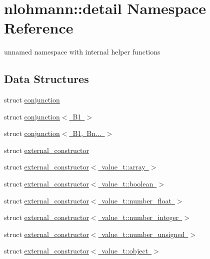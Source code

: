 \hypertarget{namespacenlohmann_1_1detail}{}\section{nlohmann\+::detail Namespace Reference}
\label{namespacenlohmann_1_1detail}


unnamed namespace with internal helper functions  


\subsection*{Data Structures}
\begin{DoxyCompactItemize}
\item 
struct \mbox{\hyperlink{structnlohmann_1_1detail_1_1conjunction}{conjunction}}
\item 
struct \mbox{\hyperlink{structnlohmann_1_1detail_1_1conjunction_3_01_b1_01_4}{conjunction$<$ B1 $>$}}
\item 
struct \mbox{\hyperlink{structnlohmann_1_1detail_1_1conjunction_3_01_b1_00_01_bn_8_8_8_01_4}{conjunction$<$ B1, Bn... $>$}}
\item 
struct \mbox{\hyperlink{structnlohmann_1_1detail_1_1external__constructor}{external\+\_\+constructor}}
\item 
struct \mbox{\hyperlink{structnlohmann_1_1detail_1_1external__constructor_3_01value__t_1_1array_01_4}{external\+\_\+constructor$<$ value\+\_\+t\+::array $>$}}
\item 
struct \mbox{\hyperlink{structnlohmann_1_1detail_1_1external__constructor_3_01value__t_1_1boolean_01_4}{external\+\_\+constructor$<$ value\+\_\+t\+::boolean $>$}}
\item 
struct \mbox{\hyperlink{structnlohmann_1_1detail_1_1external__constructor_3_01value__t_1_1number__float_01_4}{external\+\_\+constructor$<$ value\+\_\+t\+::number\+\_\+float $>$}}
\item 
struct \mbox{\hyperlink{structnlohmann_1_1detail_1_1external__constructor_3_01value__t_1_1number__integer_01_4}{external\+\_\+constructor$<$ value\+\_\+t\+::number\+\_\+integer $>$}}
\item 
struct \mbox{\hyperlink{structnlohmann_1_1detail_1_1external__constructor_3_01value__t_1_1number__unsigned_01_4}{external\+\_\+constructor$<$ value\+\_\+t\+::number\+\_\+unsigned $>$}}
\item 
struct \mbox{\hyperlink{structnlohmann_1_1detail_1_1external__constructor_3_01value__t_1_1object_01_4}{external\+\_\+constructor$<$ value\+\_\+t\+::object $>$}}

\end{DoxyCompactItemize}
